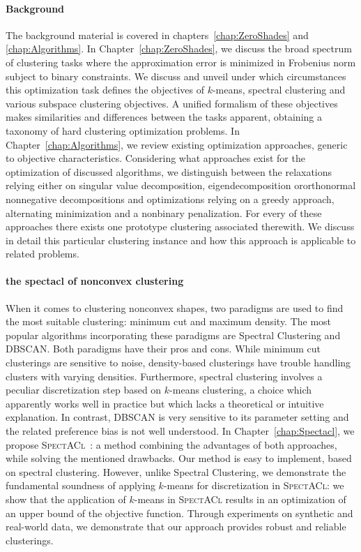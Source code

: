 \paragraph{Background} The background material is covered in chapters~\ref{chap:ZeroShades} and \ref{chap:Algorithms}. In Chapter~\ref{chap:ZeroShades}, we discuss the broad spectrum of clustering tasks where the approximation error is minimized in Frobenius norm subject to binary constraints. We discuss and unveil under which circumstances this optimization task defines the objectives of $k$-means, spectral clustering and various subspace clustering objectives. A unified formalism of these objectives makes similarities and differences between the tasks apparent, obtaining a taxonomy of hard clustering optimization problems.
In Chapter~\ref{chap:Algorithms}, we review existing optimization approaches, generic to objective characteristics. Considering what approaches exist for the optimization of discussed algorithms, we distinguish between the relaxations relying either on singular value decomposition, eigendecomposition ororthonormal nonnegative decompositions and optimizations relying on a greedy approach, alternating minimization and a nonbinary penalization.  For every of these approaches there exists one prototype clustering associated therewith. We discuss in detail this particular clustering instance and how this approach is applicable to related problems.
\paragraph{the spectacl of nonconvex clustering} 
When it comes to clustering nonconvex shapes, two paradigms are used to find the most suitable clustering: minimum cut and maximum density. The most popular algorithms incorporating these paradigms are Spectral Clustering and DBSCAN. Both paradigms have their pros and cons. While minimum cut clusterings are sensitive to noise, density-based clusterings have trouble handling clusters with varying densities. Furthermore, spectral clustering involves a peculiar discretization step based on $k$-means clustering, a choice which apparently works well in practice but which lacks a theoretical or intuitive explanation. In contrast, DBSCAN is very sensitive to its parameter setting and the related preference bias is not well understood. In Chapter~\ref{chap:Spectacl}, we propose \textsc{SpectACl}~\citep{hess2019spectacl}: a method combining the advantages of both approaches, while solving the mentioned drawbacks. Our method is easy to implement, based on spectral clustering. However, unlike Spectral Clustering, we demonstrate the fundamental soundness of applying $k$-means for discretization in \textsc{SpectACl}: we show that the application of $k$-means in \textsc{SpectACl} results in an optimization of an upper bound of the objective function. Through experiments on synthetic and real-world data, we demonstrate that our approach provides robust and reliable clusterings. 
